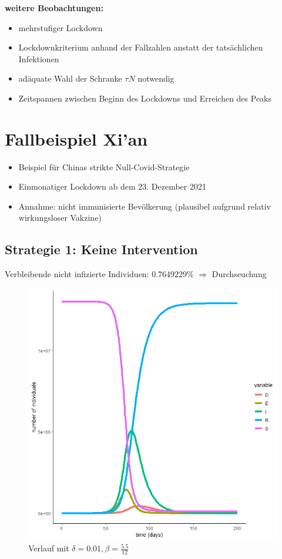 \documentclass{scrartcl}
\begin{document}
\vspace{2cm}
\textbf{weitere Beobachtungen: }
\begin{itemize}
\item mehrstufiger Lockdown
\item Lockdownkriterium anhand der Fallzahlen anstatt der tatsächlichen Infektionen
\item adäquate Wahl der Schranke $\tau N$ notwendig
\item Zeitspannen zwischen Beginn des Lockdowns und Erreichen des Peaks
\end{itemize}


%
%

\section{Fallbeispiel Xi'an}
	\begin{itemize}
		\item Beispiel für Chinas strikte Null-Covid-Strategie
		\item Einmonatiger Lockdown ab dem 23. Dezember 2021
		\item Annahme: nicht immunisierte Bevölkerung (plausibel aufgrund relativ wirkungsloser Vakzine)
	\end{itemize}

\subsection{Strategie 1: Keine Intervention}
	Verbleibende nicht infizierte Individuen: 0.7649229\% $\Rightarrow$ Durchseuchung
	\begin{figure}[h]
        	\centering
		\includegraphics[scale=0.5]{delta=0,01,beta_unveraendert,alles.png}
		\caption{Verlauf mit $\delta = 0.01, \beta = \frac{5.5}{12}$}
	\end{figure}
\end{document}
